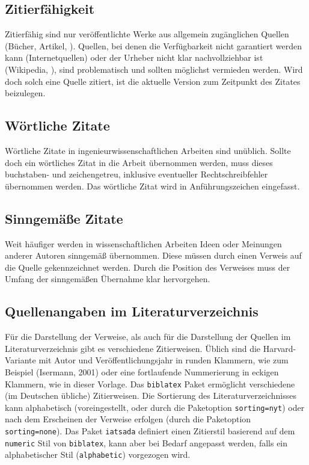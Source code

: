 \subsection*{Zitierfähigkeit}
Zitierfähig sind nur veröffentlichte Werke aus allgemein zugänglichen Quellen (Bücher, Artikel, \etc).
Quellen, bei denen die Verfügbarkeit nicht garantiert werden kann (Internetquellen) oder der Urheber nicht klar nachvollziehbar ist (Wikipedia, \oAe), sind problematisch und sollten möglichst vermieden werden.
Wird doch solch eine Quelle zitiert, ist die aktuelle Version zum Zeitpunkt des Zitates beizulegen.

\subsection*{Wörtliche Zitate}
Wörtliche Zitate in ingenieurwissenschaftlichen Arbeiten sind unüblich.
Sollte doch ein wörtliches Zitat in die Arbeit übernommen werden, muss dieses buchstaben- und zeichengetreu, inklusive eventueller Rechtschreibfehler übernommen werden.
Das wörtliche Zitat wird in Anführungszeichen eingefasst.

\subsection*{Sinngemäße Zitate}
Weit häufiger werden in wissenschaftlichen Arbeiten Ideen oder Meinungen anderer Autoren sinngemäß übernommen.
Diese müssen durch einen Verweis auf die Quelle gekennzeichnet werden.
Durch die Position des Verweises muss der Umfang der sinngemäßen Übernahme klar hervorgehen.

\subsection*{Quellenangaben im Literaturverzeichnis}
Für die Darstellung der Verweise, als auch für die Darstellung der Quellen im Literaturverzeichnis gibt es verschiedene Zitierweisen.
Üblich sind die Harvard-Variante mit Autor und Veröffentlichungsjahr in runden Klammern, wie zum Beispiel (Isermann, 2001) oder eine fortlaufende Nummerierung in eckigen Klammern, wie in dieser Vorlage.
Das \texttt{biblatex} Paket ermöglicht verschiedene (im Deutschen übliche) Zitierweisen.
Die Sortierung des Literaturverzeichnisses kann alphabetisch (voreingestellt, oder \bspw durch die Paketoption \texttt{sorting=nyt}) oder nach dem Erscheinen der Verweise erfolgen (durch die Paketoption \texttt{sorting=none}).
Das Paket \texttt{iatsada} definiert einen Zitierstil basierend auf dem \texttt{numeric} Stil von \texttt{biblatex}, kann aber bei Bedarf angepasst werden, falls \bspw ein alphabetischer Stil (\texttt{alphabetic}) vorgezogen wird.

